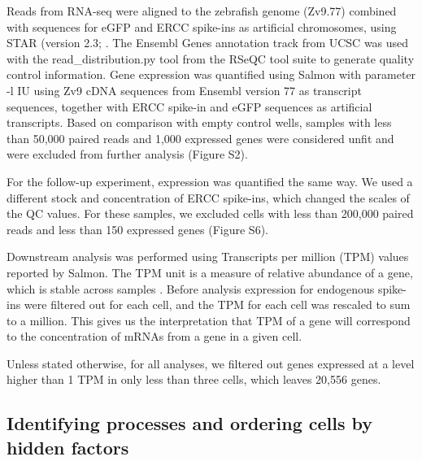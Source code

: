 Reads from RNA-seq were aligned to the zebrafish genome (Zv9.77) combined with sequences for eGFP and ERCC spike-ins as artificial chromosomes, using STAR (version 2.3;  \cite{Dobin2013-mi}. The Ensembl Genes annotation track from UCSC was used with the read\_distribution.py tool from the RSeQC tool suite \cite{Wang2012-ik} to generate quality control information. Gene expression was quantified using Salmon \cite{Patro2017-wf} with parameter -l IU using Zv9 cDNA sequences from Ensembl version 77 as transcript sequences, together with ERCC spike-in and eGFP sequences as artificial transcripts. Based on comparison with empty control wells, samples with less than 50,000 paired reads and 1,000 expressed genes were considered unfit and were excluded from further analysis (Figure S2).

For the follow-up experiment, expression was quantified the same way. We used a different stock and concentration of ERCC spike-ins, which changed the scales of the QC values. For these samples, we excluded cells with less than 200,000 paired reads and less than 150 expressed genes (Figure S6).

Downstream analysis was performed using Transcripts per million (TPM) values reported by Salmon. The TPM unit is a measure of relative abundance of a gene, which is stable across samples \cite{Li2011-op, Wagner2012-jn}. Before analysis expression for endogenous spike-ins were filtered out for each cell, and the TPM for each cell was rescaled to sum to a million. This gives us the interpretation that TPM of a gene will correspond to the concentration of mRNAs from a gene in a given cell.

Unless stated otherwise, for all analyses, we filtered out genes expressed at a level higher than 1 TPM in only less than three cells, which leaves 20,556 genes.

\subsection{Identifying processes and ordering cells by hidden factors}

